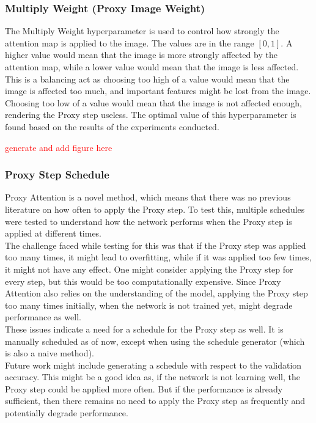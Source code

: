 \subsubsection{Multiply Weight (Proxy Image Weight)}
The Multiply Weight hyperparameter is used to control how strongly the attention map is applied to the image. The values are in the range $[0,1]$. A higher value would mean that the image is more strongly affected by the attention map, while a lower value would mean that the image is less affected. This is a balancing act as choosing too high of a value would mean that the image is affected too much, and important features might be lost from the image. Choosing too low of a value would mean that the image is not affected enough, rendering the Proxy step useless. The optimal value of this hyperparameter is found based on the results of the experiments conducted.

\textcolor{red}{generate and add figure here}

\subsubsection{Proxy Step Schedule}
Proxy Attention is a novel method, which means that there was no previous literature on how often to apply the Proxy step. To test this, multiple schedules were tested to understand how the network performs when the Proxy step is applied at different times.\\
The challenge faced while testing for this was that if the Proxy step was applied too many times, it might lead to overfitting, while if it was applied too few times, it might not have any effect. One might consider applying the Proxy step for every step, but this would be too computationally expensive. Since Proxy Attention also relies on the understanding of the model, applying the Proxy step too many times initially, when the network is not trained yet, might degrade performance as well.\\
These issues indicate a need for a schedule for the Proxy step as well. It is manually scheduled as of now, except when using the schedule generator (which is also a naive method).\\
Future work might include generating a schedule with respect to the validation accuracy. This might be a good idea as, if the network is not learning well, the Proxy step could be applied more often. But if the performance is already sufficient, then there remains no need to apply the Proxy step as frequently and potentially degrade performance.


